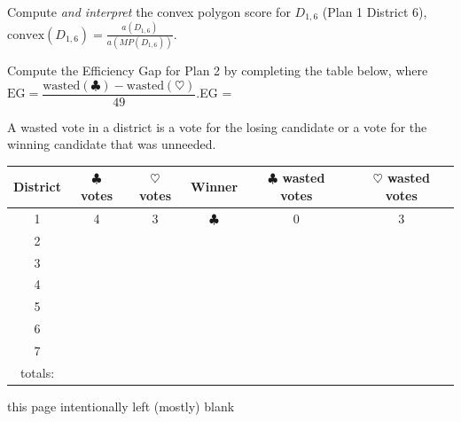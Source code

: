 \documentclass[12pt,addpoints]{exam}
\begin{document}
\begin{questions}
		\question[5] 
			Compute \textit{and interpret} the convex polygon score for $D_{1,6}$ (Plan 1 District 6),\\[.5em] \(\displaystyle \mathrm{convex}(D_{1,6}) = \frac{a(D_{1,6})}{a(MP(D_{1,6}))}.\) 
			\vfill

		\question[5] 
			Compute the Efficiency Gap for Plan 2 by completing the table below, where\\ \(\mathrm{EG} = \dfrac{ \mathrm{wasted}(\clubsuit) - \mathrm{wasted}(\heartsuit)}{49}.\)\hfill EG = \fillin[eg]

			A wasted vote in a district is a vote for the losing candidate or a vote for the winning candidate that was unneeded.

			\begin{center}
				\renewcommand{\arraystretch}{1.75}
				\begin{tabular}{|c|c|c|c|c|c|}
					\hline
					District & $\clubsuit$ votes &	$\heartsuit$ votes &	Winner &	$\clubsuit$ wasted votes	& $\heartsuit$ wasted votes \\
					\hline
					1 & 4 & 3 & $\clubsuit$ & 0 & 3 \\
					\hline
					2 & & & & & \\
					\hline
					3 & & & & & \\
					\hline
					4 & & & & & \\
					\hline
					5 & & & & & \\
					\hline
					6 & & & & & \\
					\hline
					7 & & & & & \\
					\hline 
					totals: & & & & & \\
					\hline
				\end{tabular}
			\end{center}
	\end{questions}

\clearpage

this page intentionally left (mostly) blank

\clearpage

		
\end{document}

